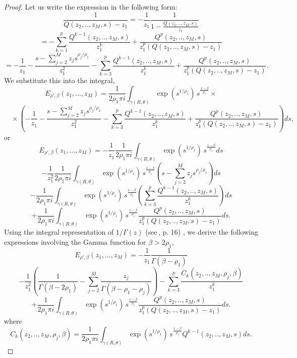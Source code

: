 \documentclass[12pt, reqno]{amsart}
\theoremstyle{definition}
\theoremstyle{remark}
\numberwithin{equation}{section}
\begin{document}
\begin{proof}
 Let us write the expression in the following form:
$$
\frac{1}{Q(z_2,..,z_M,s)-z_1}=-\frac{1}{z_1}\frac{1}{1-\frac{Q(z_2,..,z_M,s)}{z_1}}$$
$$=-\sum_{k=1}^{p}\frac{Q^{k-1}(z_2,..,z_M,s)}{z_1^k}+\frac{Q^p(z_2,..,z_M,s)}{z_1^p(Q(z_2,..,z_M,s)-z_1)}
$$
$$
=-\frac{1}{z_1}-\frac{s-\displaystyle\sum_{j=2}^{M} z_j s^{\rho_j/\rho_1}}{z_1^2}-\sum_{k=3}^{p}\frac{Q^{k-1}(z_2,..,z_M,s)}{z_1^k}+\frac{Q^p (z_2,..,z_M,s)}{z_1^p(Q(z_2,..,z_M,s)-z_1)}.
$$
We substitute this into the integral,
$$
E_{{\rho}',\beta}(z_1,\ldots,z_M)
=
\frac{1}{2\rho_1 \pi i}
\int_{\gamma(R,\theta)}
\exp\!\left(s^{1/\rho_1}\right)
\, s^{\frac{1-\beta}{\rho_1}}\times
$$
$$\quad \times
\left(
-\frac{1}{z_1}
-\frac{s-\displaystyle\sum_{j=2}^{M} z_j s^{\rho_j/\rho_1}}{z_1^2}
-\sum_{k=3}^{p}\frac{Q^{k-1}(z_2,..,z_M,s)}{z_1^k}
+\frac{Q^p(z_2,..,z_M,s)}{z_1^p(Q(z_2,..,z_M,s)-z_1)}
\right)ds,
$$
or
$$
E_{{\rho}',\beta}(z_1,\ldots,z_M)=-\frac{1}{z_1}\frac{1}{2\rho_1 \pi i}
\int_{\gamma(R,\theta)}
\exp\!\left(s^{1/\rho_1}\right)
\, s^{\frac{1-\beta}{\rho_1}}ds
$$
$$
-\frac{1}{z^2_1}\frac{1}{2\rho_1 \pi i}
\int_{\gamma(R,\theta)}
\exp\!\left(s^{1/\rho_1}\right)
\, s^{\frac{1-\beta}{\rho_1}}\left(s-\displaystyle\sum_{j=2}^{M} z_j s^{\rho_j/\rho_1}\right)ds
$$
$$
-\frac{1}{2\rho_1 \pi i}
\int_{\gamma(R,\theta)}
\exp\!\left(s^{1/\rho_1}\right)
\, s^{\frac{1-\beta}{\rho_1}}\left(\sum_{k=3}^{p}\frac{Q^{k-1}(z_2,..,z_M,s)}{z_1^k}\right)ds
$$
$$
+\frac{1}{2\rho_1 \pi i}
\int_{\gamma(R,\theta)}
\exp\!\left(s^{1/\rho_1}\right)
\, s^{\frac{1-\beta}{\rho_1}}\frac{Q^p (z_2,..,z_M,s)}{z_1^p(Q(z_2,..,z_M,s)-z_1)}ds.
$$
Using the integral representation of $1/\Gamma(z)$ (see\,\cite{3}, p. 16) , we derive the following expressions involving the Gamma function for $\beta>2\rho_1$,
$$
E_{{\rho}',\beta}(z_1,\ldots,z_M)=-\frac{1}{z_1}\frac{1}{\Gamma(\beta-\rho_1)}$$
$$-\frac{1}{z_1^2}\left(\frac{1}{\Gamma(\beta-2\rho_1)}
-
\sum_{j=2}^{M}
\frac{z_j}{\Gamma(\beta-\rho_1-\rho_j)}\right)-\sum_{k=3}^p \frac{C_k(z_2,..,z_M,\rho_j,\beta)}{z_1^k}
$$
$$
+\frac{1}{2\rho_1 \pi i}
\int_{\gamma(R,\theta)}
\exp\!\left(s^{1/\rho_1}\right)
\, s^{\frac{1-\beta}{\rho_1}}\frac{Q^p (z_2,..,z_M,s)}{z_1^p(Q(z_2,..,z_M,s)-z_1)}ds.
$$
where
$$
C_k(z_2,..,z_M,\rho_j,\beta)=\frac{1}{2\rho_1 \pi i}
\int_{\gamma(R,\theta)}
\exp\!\left(s^{1/\rho_1}\right)
\, s^{\frac{1-\beta}{\rho_1}}Q^{k-1}(z_2,..,z_M,s)ds.
$$


\end{proof}
\end{document}
